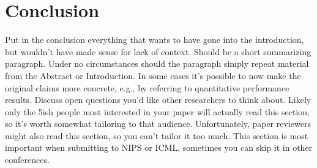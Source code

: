\section{Conclusion}
\label{conclusion}

Put in the conclusion everything that wants to have gone into the introduction, but wouldn't have made sense for lack of context. Should be a short summarizing paragraph. Under no circumstances should the paragraph simply repeat material from the Abstract or Introduction. In some cases it's possible to now make the original claims more concrete, e.g., by referring to quantitative performance results. Discuss open questions you'd like other researchers to think about. Likely only the 5ish people most interested in your paper will actually read this section, so it's worth somewhat tailoring to that audience. Unfortunately, paper reviewers might also read this section, so you can't tailor it too much. This section is most important when submitting to NIPS or ICML, sometimes you can skip it in other conferences.